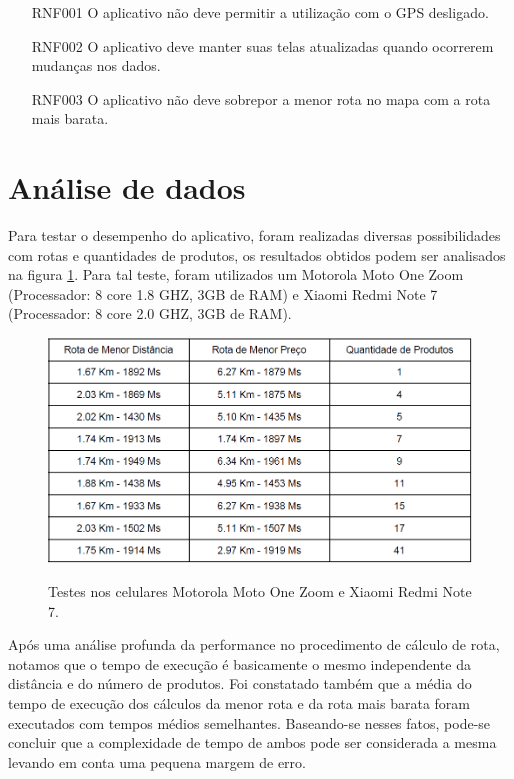 \begin{itemize}
\item [RNF001] O aplicativo não deve permitir a utilização com o GPS desligado.
\item [RNF002] O aplicativo deve manter suas telas atualizadas quando ocorrerem mudanças nos dados.
\item [RNF003] O aplicativo não deve sobrepor a menor rota no mapa com a rota mais barata.
\end{itemize}


\section{Análise de dados}
Para testar o desempenho do aplicativo, foram realizadas diversas possibilidades com rotas e quantidades de produtos, os resultados obtidos podem ser analisados na figura \ref{fig:tabelaestado}. Para tal teste, foram utilizados um Motorola Moto One Zoom (Processador: 8 core 1.8 GHZ, 3GB de RAM) e Xiaomi Redmi Note 7 (Processador: 8 core 2.0 GHZ, 3GB de RAM).

\begin{figure}[H]
   	\centering
   		\caption{Testes nos celulares Motorola Moto One Zoom e Xiaomi Redmi Note 7.}
	   	\includegraphics[scale=0.64]{Imagens/AnaliseDeDados.PNG}
   		\label{fig:tabelaestado}
\end{figure}

Após uma análise profunda da performance no procedimento de cálculo de rota, notamos que o
tempo de execução é basicamente o mesmo independente da distância e do número de
produtos. Foi constatado também que a média do tempo de execução dos cálculos da menor
rota e da rota mais barata foram executados com tempos médios semelhantes. Baseando-se
nesses fatos, pode-se concluir que a complexidade de tempo de ambos pode ser considerada
a mesma levando em conta uma pequena margem de erro.

